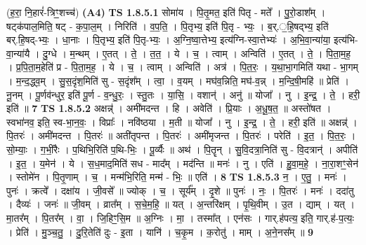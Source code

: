 \documentclass[17pt]{extarticle}
\begin{document}
                  \newline
                      (ह॒रा॒ नि॒हारं॑-त्रिꣳ॒॒शच्च॑)  \textbf{(A4)} \newline \newline
                                \textbf{ TS 1.8.5.1} \newline
                  सोमा॑य । पि॒तृ॒मत॒ इति॑ पितृ - मते᳚ । पु॒रो॒डाश᳚म् । षट्क॑पाल॒मिति॒ षट् - क॒पा॒ल॒म् । निरिति॑ । व॒प॒ति॒ । पि॒तृभ्य॒ इति॑ पि॒तृ - भ्यः॒ । ब॒र्.॒हि॒षद्भ्य॒ इति॑ बर्.हि॒षद्-भ्यः॒ । धा॒नाः । पि॒तृभ्य॒ इति॑ पि॒तृ-भ्यः॒ । अ॒ग्नि॒ष्वा॒त्तेभ्य॒ इत्य॑ग्नि-स्वा॒त्तेभ्यः॑ । अ॒भि॒वा॒न्या॑या॒ इत्य॑भि-वा॒न्या॑यै । दु॒ग्धे । म॒न्थम् । ए॒तत् । ते॒ । त॒त॒ । ये । च॒ । त्वाम् । अन्विति॑ । ए॒तत् । ते॒ । पि॒ता॒म॒ह॒ । प्र॒पि॒ता॒म॒हेति॑ प्र - पि॒ता॒म॒ह॒ । ये । च॒ । त्वाम् । अन्विति॑ । अत्र॑ । पि॒त॒रः॒ । य॒था॒भा॒गमिति॑ यथा - भा॒गम् । म॒न्द॒द्ध्व॒म् । सु॒स॒दृंश॒मिति॑ सु - स॒दृंश᳚म् । त्वा॒ । व॒यम् । मघ॑व॒न्निति॒ मघ॑-व॒न्न् । म॒न्दि॒षी॒महि॑ ॥ प्रेति॑ । नू॒नम् । पू॒र्णव॑न्धुर॒ इति॑ पू॒र्ण - व॒न्धु॒रः॒ । स्तु॒तः । या॒सि॒ । वशान्॑ । अनु॑ ॥ योजा᳚ । नु । इ॒न्द्र॒ । ते॒ । हरी॒ इति॑ ॥ \textbf{  7} \newline
                  \newline
                                \textbf{ TS 1.8.5.2} \newline
                  अक्षन्न्॑ । अमी॑मदन्त । हि । अवेति॑ । प्रि॒याः । अ॒धू॒ष॒त॒ ॥ अस्तो॑षत । स्वभा॑नव॒ इति॒ स्व-भा॒न॒वः॒ । विप्राः᳚ । नवि॑ष्ठया । म॒ती ॥ योजा᳚ । नु । इ॒न्द्र॒ । ते॒ । हरी॒ इति॑ ॥ अक्षन्न्॑ । पि॒तरः॑ । अमी॑मदन्त । पि॒तरः॑ ॥ अती॑तृपन्त । पि॒तरः॑ । अमी॑मृजन्त । पि॒तरः॑ । परेति॑ । इ॒त॒ । पि॒त॒रः॒ । सो॒म्याः॒ । ग॒भीं॒रैः । प॒थिभि॒रिति॑ प॒थि-भिः॒ । पू॒र्व्यैः ॥ अथ॑ । पि॒तॄन् । सु॒वि॒दत्रा॒निति॑ सु - वि॒दत्रान्॑ । अपीति॑ । इ॒त॒ । य॒मेन॑ । ये । स॒ध॒माद॒मिति॑ सध - माद᳚म् । मद॑न्ति ॥ मनः॑ । नु । एति॑ । हु॒वा॒म॒हे॒ । ना॒रा॒शꣳ॒॒सेन॑ । स्तोमे॑न । पि॒तृ॒णाम् । च॒ । मन्म॑भि॒रिति॒ मन्म॑ - भिः॒ ॥ एति॑ । \textbf{  8} \newline
                  \newline
                                \textbf{ TS 1.8.5.3} \newline
                  न॒ । ए॒तु॒ । मनः॑ । पुनः॑ । क्रत्वे᳚ । दक्षा॑य । जी॒वसे᳚ ॥ ज्योक् । च॒ । सूर्य᳚म् । दृ॒शे ॥ पुनः॑ । नः॒ । पि॒तरः॑ । मनः॑ । ददा॑तु । दैव्यः॑ । जनः॑ ॥ जी॒वम् । व्रात᳚म् । स॒चे॒म॒हि॒ ॥ यत् । अ॒न्तरि॑क्षम् । पृ॒थि॒वीम् । उ॒त । द्याम् । यत् । मा॒तर᳚म् । पि॒तर᳚म् । वा॒ । जि॒हिꣳ॒॒सि॒म ॥ अ॒ग्निः । मा॒ । तस्मा᳚त् । एन॑सः । गार्.ह॑पत्य॒ इति॒ गार्.ह॑-प॒त्यः॒ । प्रेति॑ । मु॒ञ्च॒तु॒ । दु॒रि॒तेति॑ दुः - इ॒ता । यानि॑ । च॒कृ॒म । क॒रोतु॑ । माम् । अ॒ने॒नस᳚म् ॥ \textbf{  9} \newline
\end{document}
